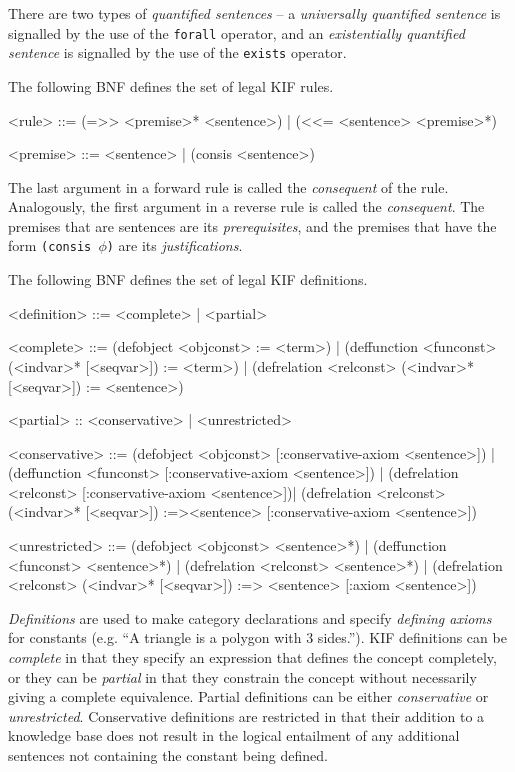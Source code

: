 There are two types of {\it quantified sentences} -- a {\it universally quantified
sentence} is signalled by the use of the {\tt forall} operator, and an {\it
existentially quantified sentence} is signalled by the use of the {\tt exists}
operator.  

The following BNF defines the set of legal KIF rules.

\medskip
\beginverbatim
<rule> ::= (=>> <premise>* <sentence>) |
           (<<= <sentence> <premise>*)

<premise> ::= <sentence> | (consis <sentence>)
\endverbatim
\medskip

The last argument in a forward rule is called the {\it consequent} of
the rule.  Analogously, the first argument in a reverse rule is
called the {\it consequent}.  The premises that are sentences are its {\sl
prerequisites}, and the premises that have the form {\tt (consis $\phi$)} are
its {\it justifications}.

The following BNF defines the set of legal KIF definitions.

\medskip
\beginverbatim
<definition> ::= <complete> | <partial>

<complete> ::= 
 (defobject <objconst> := <term>) |
 (deffunction <funconst> (<indvar>* [<seqvar>]) := <term>) |
 (defrelation <relconst> (<indvar>* [<seqvar>]) := <sentence>)

<partial> :: <conservative> | <unrestricted>

<conservative> ::= 
 (defobject <objconst> [:conservative-axiom <sentence>]) |
 (deffunction <funconst> [:conservative-axiom <sentence>]) |
 (defrelation <relconst> [:conservative-axiom <sentence>])|
 (defrelation <relconst> (<indvar>* [<seqvar>])
   :=><sentence> [:conservative-axiom <sentence>])

<unrestricted> ::=
 (defobject <objconst> <sentence>*) |
 (deffunction <funconst> <sentence>*) |
 (defrelation <relconst> <sentence>*) |
 (defrelation <relconst> (<indvar>* [<seqvar>])
   :=> <sentence> [:axiom <sentence>])
\endverbatim
\medskip

{\it Definitions} are used to make category declarations and specify {\it
defining axioms} for constants (e.g. ``A triangle is a polygon with 3
sides.'').  KIF definitions can be {\it complete} in that they specify an
expression that defines the concept completely, or they can be {\it partial} in
that they constrain the concept without necessarily giving a complete
equivalence.  Partial definitions can be either {\it conservative} or {\it
unrestricted}.  Conservative definitions are restricted in that their addition to
a knowledge base does not result in the logical entailment of any additional
sentences not containing the constant being defined.

